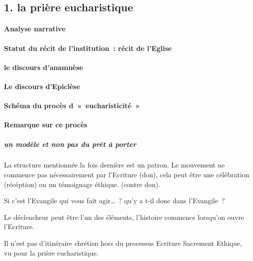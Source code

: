\hypertarget{la-priuxe8re-eucharistique}{%
\subsection{1. la prière
eucharistique}\label{la-priuxe8re-eucharistique}}
 
  \paragraph{Analyse narrative}\label{analyse-narrative} 
  \paragraph{Statut du récit de l'institution~: récit de
  l'Eglise} 
  
  \paragraph{le discours
  d'anamnèse} 
 
  \paragraph{Le discours d'Epiclèse  } 
  \paragraph{Schéma du procès
  d~«~eucharisticité~»} 

\hypertarget{remarque-sur-ce-procuxe8s}{%
\paragraph{Remarque sur ce
procès}\label{remarque-sur-ce-procuxe8s}}

\hypertarget{a.-un-moduxe8le-et-non-pas-du-pruxeat-uxe0-porter}{%
\subparagraph{un modèle et non pas du prêt à
porter}\label{a.-un-moduxe8le-et-non-pas-du-pruxeat-uxe0-porter}}

La structure mentionnée la fois dernière est un patron. Le mouvement ne
commence pas nécessairement par l'Ecriture (don), cela peut être une
célébration (récéption) ou un témoignage éthique. (contre don).

Si c'est l'Evangile qui vous fait agir\ldots~? qu'y a t-il donc dans
l'Evangile~?

Le déclencheur peut être l'un des éléments, l'histoire commence
lorsqu'on ouvre l'Ecriture.

Il n'est pas d'itinéraire chrétien hors du processus Ecriture Sacrement
Ethique, vu pour la prière eucharistique.

